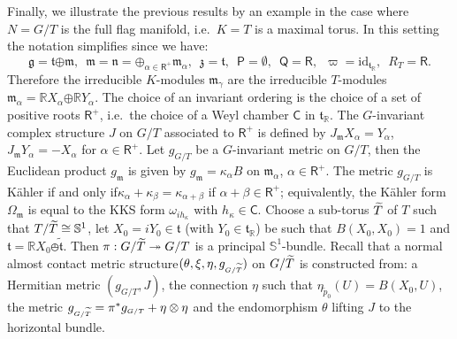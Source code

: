 \documentclass[a4paper,reqno]{amsart}
\theoremstyle{definition}
\theoremstyle{remark}
\theoremstyle{plain}
\numberwithin{equation}{section}
\newcommand{\R}{{\mathbb{R}}}
\newcommand{\bbS}{{\mathbb{S}}}
\newcommand{\g}{{\mathfrak{g}}}  %
\newcommand{\fm}{{\mathfrak{m}}}
\newcommand{\fn}{{\mathfrak{n}}}
\newcommand{\fz}{{\mathfrak{z}}}
\newcommand{\ft}{{\mathfrak{t}}}
\newcommand{\Csf}{{\mathsf{C}}}
\newcommand{\sto}{\twoheadrightarrow}
\def\boplus{\mathbin{\boldsymbol{\oplus}}}
\newcommand{\id}{{\mathrm{id}}}
\newcommand{\vpi}{\varpi}
\newcommand{\roots}{\mathsf{R}}
\newcommand{\proots}{\mathsf{R}^+}
\newcommand{\rootsP}{\mathsf{P}}
\newcommand{\rootsQ}{\mathsf{Q}}
\newcommand{\wt}{{\widetilde{\mathfrak{t}}}}
\newcommand{\wpzero}{{\tilde{p}_0}}
\newcommand{\kahler}{K\"ahler\xspace}
\newcommand{\sissi}{if and only if\xspace}
\newcommand{\NACMS}{normal almost contact metric
  structure\xspace}
\newcommand{\txeMT}{{(\theta,\xi,\eta,g_{\scriptscriptstyle{G/\wT}})}}
\begin{document}
Finally, we  illustrate the previous results %
by an example in the case where $N=G/T$ is the full flag
manifold, i.e.~$K=T$ is a maximal torus. In this setting the
notation simplifies since we have:
\[
\g= \ft \boplus \fm, \ \; \fm = \fn = \boplus_{\alpha \in
   \proots} \fm_\alpha,  \  \;  \fz= \ft, \ \;  
 \rootsP = \emptyset, \ \; \rootsQ= \roots, \ \;  \vpi =
 \id_{\ft_\R}, \  \; R_T= \roots.
\]
Therefore the irreducible $K$-modules $\fm_\gamma$ are the
irreducible $T$-modules
$\fm_\alpha = \R X_\alpha \boplus \R Y_\alpha$. The choice of an
invariant ordering is the choice of a set of positive roots
$\proots$, i.e.~the choice of a Weyl chamber $\Csf$ in $\ft_\R$.  The
$G$-invariant complex structure $J$ on $G/T$ associated to
$\proots$ is defined  by $J_\fm X_\alpha = Y_\alpha$,
$J_\fm Y_\alpha = - X_\alpha$ for $\alpha \in \proots$. Let
$g_{\scriptscriptstyle{G/T}}$ be a $G$-invariant metric on $G/T$, then 
the Euclidean product $g_\fm$ is given by $g_\fm =
\kappa_\alpha B$ on $\fm_\alpha$,  $\alpha \in \proots$. The metric $g_{\scriptscriptstyle{G/T}}$ is
\kahler \sissi $\kappa_\alpha + \kappa_\beta = \kappa_{\alpha +
  \beta}$ if $\alpha + \beta \in \proots$; equivalently, the
\kahler form $\Omega_\fm$ is equal to the KKS form
$\omega_{ih_\kappa}$ with $h_\kappa \in \Csf$.
Choose a sub-torus ${\widetilde{T}}$ of $T$ such that
$T/\wT \cong \bbS^1$, let $X_0 =iY_0\in \ft$ (with
$Y_0 \in \ft_\R$) be such that $B(X_0,X_0) =1$ and
$\ft = \R X_0 \obot \wt$. Then
$\pi : G/\wT \sto  G/T$ is a principal $\bbS^1$-bundle.
Recall that a \NACMS $\txeMT$ on $G/{\widetilde{T}}$ is constructed from: a
Hermitian metric $(g_{\scriptscriptstyle{G/T}},J)$, the connection $\eta$ such
that $\eta_\wpzero(U) = B(X_0,U)$, the metric
$g_{\scriptscriptstyle{G/{\widetilde{T}}}} = \pi ^* g_{\scriptscriptstyle{G/T}} + \eta \otimes \eta$ and the
endomorphism $\theta$ lifting $J$ to the horizontal bundle.
\end{document}
